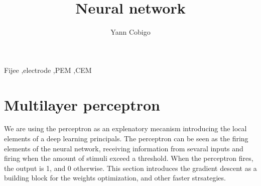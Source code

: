 \documentclass[final, paper=letter,5p,times,twocolumn]{elsarticle}
\begin{document}
\begin{frontmatter}

\title{Neural network}

\author[label1]{Yann Cobigo}
\address[label1]{University of California, San Francisco | ucsf.edu}




\begin{abstract}
\end{abstract}

\begin{keyword}
Fijee \sep electrode \sep PEM \sep CEM
\end{keyword}

\end{frontmatter}



\section{Multilayer perceptron}

We are using the perceptron as an explenatory mecanism introducing the local elements of a deep learning principals. The perceptron can be seen as the firing elements of the neural network, receiving information from sevaral inputs and firing when the amount of stimuli exceed a threshold. When the perceptron fires, the output is 1, and 0 otherwise. This section introduces the gradient descent as a building block for the weights optimization, and other faster strsategies.
\end{document}
